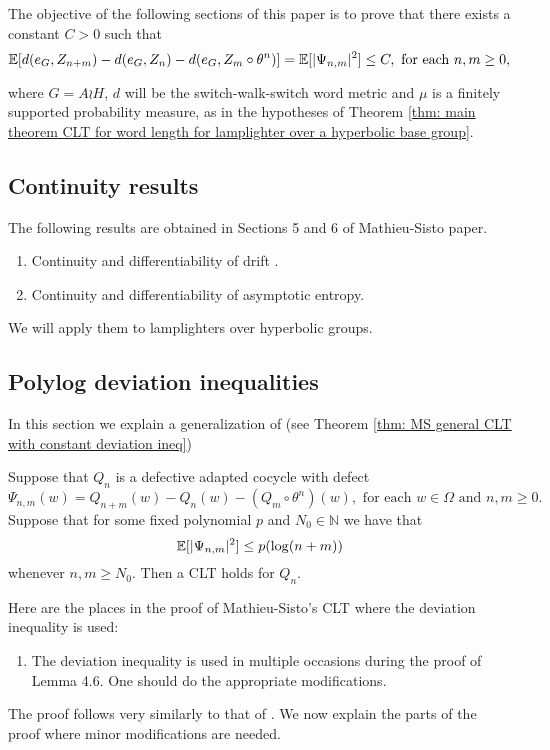 The objective of the following sections of this paper is to prove that there exists a constant $C>0$ such that
\[
\mathbb{E}[d(e_G,Z_{n+m})-d(e_G,Z_n)-d(e_G,Z_m\circ \theta^n)]=\mathbb{E}[|\Psi_{n,m}|^2]\le C, \text{ for each }n,m\ge 0,
\]

where $G=A\wr H$, $d$ will be the switch-walk-switch word metric and $\mu$ is a finitely supported probability measure, as in the hypotheses of Theorem \ref{thm: main theorem CLT for word length for lamplighter over a hyperbolic base group}.

\subsection{Continuity results}
The following results are obtained in Sections 5 and 6 of Mathieu-Sisto paper.
\begin{enumerate}
	\item Continuity and differentiability of drift .
	\item Continuity and differentiability of asymptotic entropy.
\end{enumerate}
We will apply them to lamplighters over hyperbolic groups.
\subsection{Polylog deviation inequalities}

In this section we explain a generalization of \cite[Theorems 4.1 \& 4.2]{MathieuSisto2020} (see Theorem \ref{thm: MS general CLT with constant deviation ineq})
\begin{thm} \label{thm: polylogarithmic MS CLT}
	Suppose that $Q_n$ is a defective adapted cocycle with defect
\[
\Psi_{n,m}(w)=Q_{n+m}(w)-Q_n(w)-(Q_m\circ \theta^n)(w), \text{ for each }w\in \Omega \text{ and }n,m\ge 0.
\] 
	Suppose that for some fixed polynomial $p$ and $N_0 \in \mathbb{N}$ we have that
	\[
	\mathbb{E}[|\Psi_{n,m}|^2] \le p(\log (n+m))
	\]
	whenever $n,m \ge N_0$.
	Then a CLT holds for $Q_n$.
\end{thm}

Here are the places in the proof of Mathieu-Sisto's CLT where the deviation inequality is used:
\begin{enumerate}
	\item The deviation inequality is used in multiple occasions during the proof of Lemma 4.6. One should do the appropriate modifications.
\end{enumerate}
The proof follows very similarly to that of \cite[Theorems 4.1\& 4.2]{MathieuSisto2020}. We now explain the parts of the proof where minor modifications are needed.

